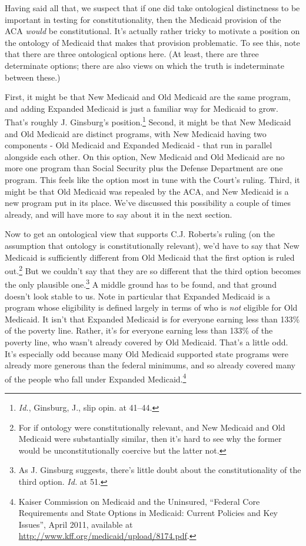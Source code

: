\documentclass[
  11pt,
  letterpaper,
  DIV=11,
  numbers=noendperiod,
  twoside]{scrartcl}
\begin{document}
Having said all that, we suspect that if one did take ontological
distinctness to be important in testing for constitutionality, then the
Medicaid provision of the ACA \emph{would} be constitutional. It's
actually rather tricky to motivate a position on the ontology of
Medicaid that makes that provision problematic. To see this, note that
there are three ontological options here. (At least, there are three
determinate options; there are also views on which the truth is
indeterminate between these.)

First, it might be that New Medicaid and Old Medicaid are the same
program, and adding Expanded Medicaid is just a familiar way for
Medicaid to grow. That's roughly J. Ginsburg's position.\footnote{\emph{Id.},
  Ginsburg, J., slip opin. at 41--44.} Second, it might be that New
Medicaid and Old Medicaid are distinct programs, with New Medicaid
having two components - Old Medicaid and Expanded Medicaid - that run in
parallel alongside each other. On this option, New Medicaid and Old
Medicaid are no more one program than Social Security plus the Defense
Department are one program. This feels like the option most in tune with
the Court's ruling. Third, it might be that Old Medicaid was repealed by
the ACA, and New Medicaid is a new program put in its place. We've
discussed this possibility a couple of times already, and will have more
to say about it in the next section.

Now to get an ontological view that supports C.J. Roberts's ruling (on
the assumption that ontology is constitutionally relevant), we'd have to
say that New Medicaid is sufficiently different from Old Medicaid that
the first option is ruled out.\footnote{For if ontology were
  constitutionally relevant, and New Medicaid and Old Medicaid were
  substantially similar, then it's hard to see why the former would be
  unconstitutionally coercive but the latter not.} But we couldn't say
that they are so different that the third option becomes the only
plausible one.\footnote{As J. Ginsburg suggests, there's little doubt
  about the constitutionality of the third option. \emph{Id.} at 51.} A
middle ground has to be found, and that ground doesn't look stable to
us. Note in particular that Expanded Medicaid is a program whose
eligibility is defined largely in terms of who is \emph{not} eligible
for Old Medicaid. It isn't that Expanded Medicaid is for everyone
earning less than 133\% of the poverty line. Rather, it's for everyone
earning less than 133\% of the poverty line, who wasn't already covered
by Old Medicaid. That's a little odd. It's especially odd because many
Old Medicaid supported state programs were already more generous than
the federal minimums, and so already covered many of the people who fall
under Expanded Medicaid.\footnote{Kaiser Commission on Medicaid and the
  Uninsured, ``Federal Core Requirements and State Options in Medicaid:
  Current Policies and Key Issues'', April 2011, available at
  \url{http://www.kff.org/medicaid/upload/8174.pdf}.}
\end{document}

